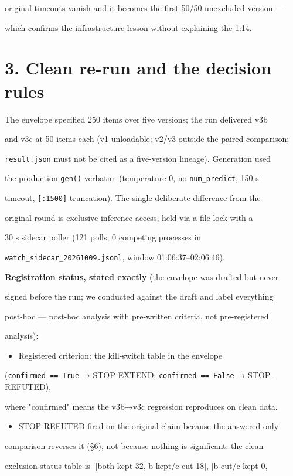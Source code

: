 \documentclass[11pt,a4paper]{article}
\begin{document}
original timeouts vanish and it becomes the first 50/50 unexcluded version —

which confirms the infrastructure lesson without explaining the 1:14.

\section*{3. Clean re-run and the decision rules}
The envelope specified 250 items over five versions; the run delivered v3b

and v3c at 50 items each (v1 unloadable; v2/v3 outside the paired comparison;

\texttt{result.json} must not be cited as a five-version lineage). Generation used

the production \texttt{gen()} verbatim (temperature 0, no \texttt{num\_predict}, 150 s

timeout, \texttt{[:1500]} truncation). The single deliberate difference from the

original round is exclusive inference access, held via a file lock with a

30 s sidecar poller (121 polls, 0 competing processes in

\texttt{watch\_sidecar\_20261009.jsonl}, window 01:06:37–02:06:46).

\textbf{Registration status, stated exactly} (the envelope was drafted but never

signed before the run; we conducted against the draft and label everything

post-hoc — post-hoc analysis with pre-written criteria, not pre-registered

analysis):

\begin{itemize}
\item Registered criterion: the kill-switch table in the envelope
\end{itemize}
(\texttt{confirmed == True} → STOP-EXTEND; \texttt{confirmed == False} → STOP-REFUTED),

where "confirmed" means the v3b→v3c regression reproduces on clean data.

\begin{itemize}
\item STOP-REFUTED fired on the original claim because the answered-only
\end{itemize}
comparison reverses it (§6), not because nothing is significant: the clean

exclusion-status table is [[both-kept 32, b-kept/c-cut 18], [b-cut/c-kept 0,
\end{document}
